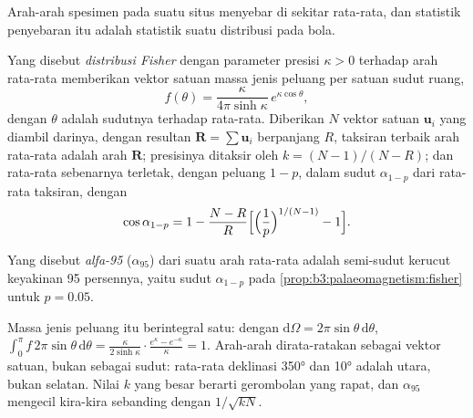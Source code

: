 Arah-arah spesimen pada suatu situs menyebar di sekitar rata-rata, dan
statistik penyebaran itu adalah statistik suatu distribusi pada bola.

\begin{proposition}\label{prop:b3:palaeomagnetism:fisher}
Yang disebut \emph{distribusi Fisher} dengan parameter presisi
$\kappa > 0$ terhadap arah rata-rata memberikan vektor satuan massa jenis peluang
per satuan sudut ruang,
\[
  f(\theta) = \frac{\kappa}{4\pi\sinh\kappa}\,e^{\kappa\cos\theta},
\]
dengan $\theta$ adalah sudutnya terhadap rata-rata. Diberikan $N$ vektor satuan $\mathbf u_i$
yang diambil darinya, dengan resultan $\mathbf R = \sum\mathbf u_i$ berpanjang $R$, taksiran
terbaik arah rata-rata adalah arah $\mathbf R$; presisinya
ditaksir oleh $k = (N - 1)/(N - R)$; dan rata-rata sebenarnya terletak, dengan peluang
$1 - p$, dalam sudut $\alpha_{1-p}$ dari rata-rata taksiran, dengan
\[
  \cos\alpha_{1-p} = 1 - \frac{N - R}{R}\Bigl[\Bigl(\frac1p\Bigr)^{1/(N-1)} - 1\Bigr].
\]
\end{proposition}
\admitted

\begin{definition}[Alfa-95]\label{def:b3:palaeomagnetism:a95}
Yang disebut \emph{alfa-95} ($\alpha_{95}$) dari suatu arah rata-rata adalah
semi-sudut kerucut keyakinan 95 persennya, yaitu sudut $\alpha_{1-p}$ pada
\cref{prop:b3:palaeomagnetism:fisher} untuk $p = 0.05$.
\end{definition}

Massa jenis peluang itu berintegral satu: dengan $\mathrm d\Omega = 2\pi\sin\theta\,\mathrm
d\theta$, $\int_0^\pi f\,2\pi\sin\theta\,\mathrm d\theta =
\frac{\kappa}{2\sinh\kappa}\cdot\frac{e^\kappa - e^{-\kappa}}{\kappa} = 1$. Arah-arah dirata-ratakan sebagai
vektor satuan, bukan sebagai sudut: rata-rata deklinasi \ang{350} dan \ang{10} adalah
utara, bukan selatan. Nilai $k$ yang besar berarti gerombolan yang rapat, dan $\alpha_{95}$ mengecil
kira-kira sebanding dengan $1/\sqrt{kN}$.

